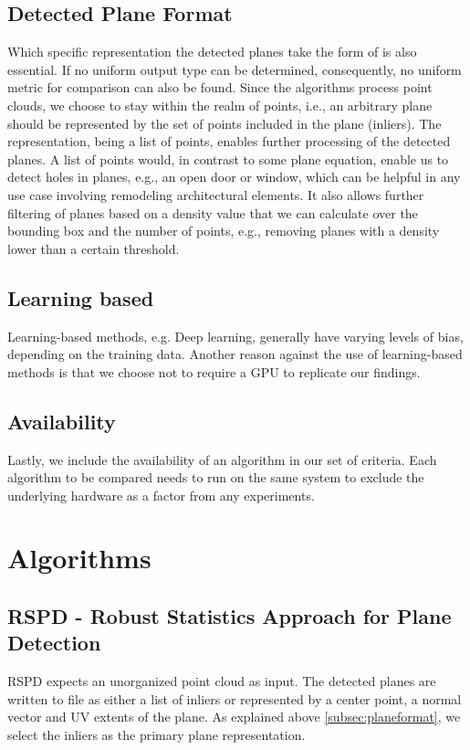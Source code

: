 \documentclass[main.tex]{subfiles}
\begin{document}
\subsection*{Detected Plane Format} \label{subsec:planeformat}
Which specific representation the detected planes take the form of is also essential.
If no uniform output type can be determined, consequently, no uniform metric for comparison can also be found.
Since the algorithms process point clouds, we choose to stay within the realm of points, i.e., an arbitrary plane should be
represented by the set of points included in the plane (inliers).
The representation, being a list of points, enables further processing of the detected planes.
A list of points would, in contrast to some plane equation, enable us to detect holes in planes, e.g.,
an open door or window, which can be helpful in any use case involving remodeling architectural elements.
It also allows further filtering of planes based on a density value that we can calculate over the bounding
box and the number of points, e.g., removing planes with a density lower than a certain threshold.


\subsection*{Learning based}\label{subsec_learning_based}
Learning-based methods, e.g. Deep learning, generally have varying levels of bias, depending on the training data. 
Another reason against the use of learning-based methods is that we choose not to require a GPU to replicate our findings.

\subsection*{Availability}
Lastly, we include the availability of an algorithm in our set of criteria.
Each algorithm to be compared needs to run on the same system to exclude the underlying hardware as a factor from any experiments.\\

\section{Algorithms}
\subsection*{RSPD - Robust Statistics Approach for Plane Detection}
RSPD expects an unorganized point cloud as input. The detected planes are written to file as either a list of inliers or
represented by a center point, a normal vector and UV extents of the plane.
As explained above \ref{subsec:planeformat}, we select the inliers as the primary plane representation. 
\end{document}

